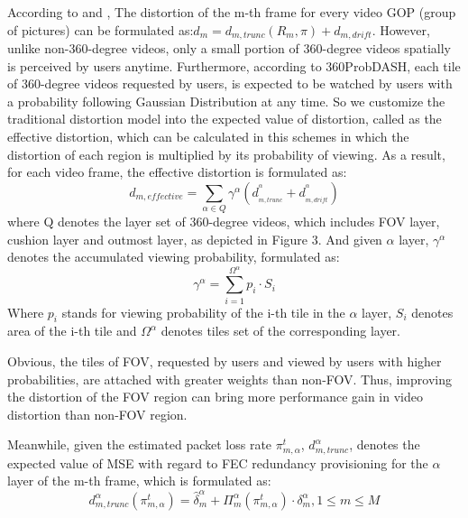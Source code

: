 According to \cite{distortion_model} and \cite{CMT-VR}, 
The distortion of the m-th frame for every video GOP (group of pictures) can be formulated as:${d_m} = d_{m,trunc}(R_m,\pi) + {d_{m,drift}}$.
However, unlike non-360-degree videos, only a small portion of 360-degree videos spatially is perceived by users anytime. Furthermore, according to 360ProbDASH\cite{360ProbDASH}, each tile of 360-degree videos requested by users, is expected to be watched by users with a probability following Gaussian Distribution at any time. So we customize the traditional distortion model into the expected value of distortion, called as the effective distortion, which can be calculated in this schemes in which the distortion of each region is multiplied by its probability of viewing. 
As a result, for each video frame, the effective distortion is formulated as:
\[{d_{m,effective}} = \sum\limits_{\alpha  \in Q} {{\gamma ^\alpha }(d_{_{m,trunc}}^{^\alpha } + d_{_{m,drift}}^{^\alpha })}\]
where Q denotes the layer set of 360-degree videos, which includes FOV layer, cushion layer and outmost layer, as depicted in Figure 3. And given $\alpha $
layer, ${\gamma ^\alpha }$ denotes the accumulated viewing probability, formulated as:
\begin{equation}
{\gamma ^\alpha } = \sum\limits_{i = 1}^{{\Omega ^\alpha }} {{p_i} \cdot
	{S_i}}
\end{equation}
Where ${p_i}$ stands for viewing probability of the i-th tile in the $\alpha $
layer, ${S_i}$ denotes area of the i-th tile and
${\Omega ^\alpha }$ denotes tiles set of the corresponding layer. 

Obvious, the tiles of FOV, requested by users and viewed by users with higher probabilities, are attached with greater weights than non-FOV. Thus, improving the distortion of the FOV region can bring more performance gain in video distortion than non-FOV region. 

Meanwhile, given the estimated packet loss rate $\pi _{m,\alpha }^t$,  $d_{m,trunc}^\alpha$, denotes the expected value of MSE with regard to FEC redundancy provisioning for the $\alpha$ layer of the m-th frame, which is
formulated as:
\[d_{m,trunc}^\alpha (\pi _{m,\alpha }^t) = \widehat \delta _m^\alpha  + \Pi _m^\alpha (\pi _{m,\alpha }^t)\cdot\delta _m^\alpha ,1 \le m \le M\]	

